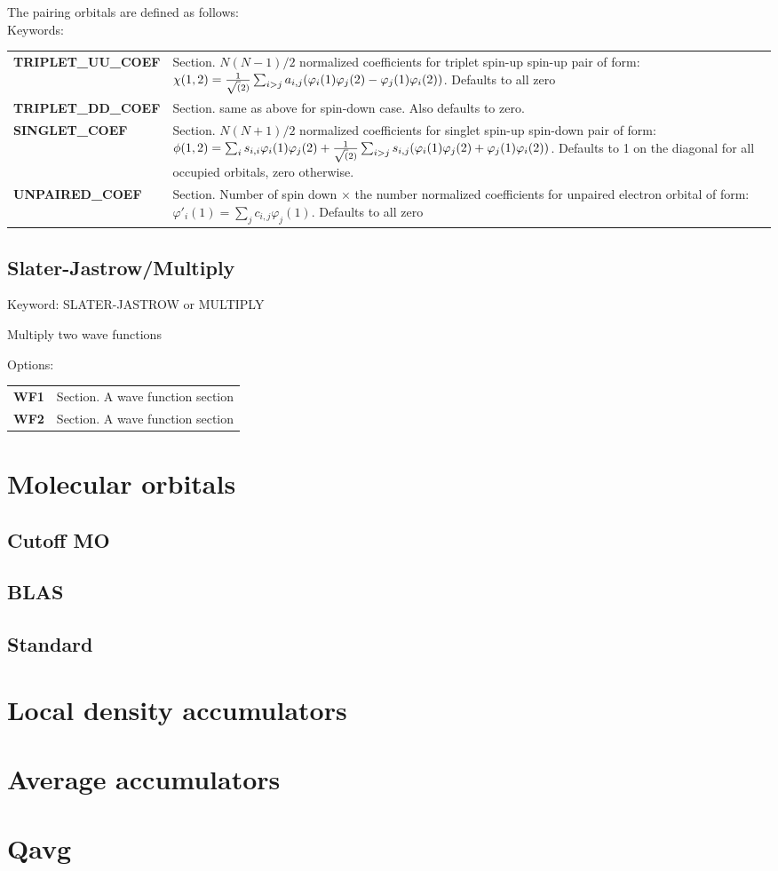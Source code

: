 \documentclass[12pt]{article}
\begin{document}
The pairing orbitals are defined as follows:\\
Keywords: \\
\begin{tabular}{lp{12cm}}
{\bf TRIPLET\_UU\_COEF} & Section. $ N(N-1)/2 $ normalized coefficients for triplet spin-up spin-up pair of form: 
$ \chi(1,2)= {1 \over \sqrt(2)} \sum_{i>j} a_{i,j}( \varphi_i(1)\varphi_j(2)- \varphi_j(1)\varphi_i(2))$. Defaults to all zero \\
{\bf TRIPLET\_DD\_COEF } & Section. same as above for spin-down case.  Also defaults to zero. \\
{\bf SINGLET\_COEF } & Section.  
$ N(N+1)/2 $ normalized coefficients 
for singlet spin-up spin-down pair of form:
$ \phi(1,2)= \sum_{i} s_{i,i} \varphi_i(1)\varphi_j(2) + {1 \over \sqrt(2)} \sum_{i>j} s_{i,j}( \varphi_i(1)\varphi_j(2)+\varphi_j(1)\varphi_i(2))$. Defaults to 1 on the diagonal for all occupied orbitals, zero otherwise. \\
{\bf UNPAIRED\_COEF} & Section.  Number of spin down $\times$ the number normalized coefficients for unpaired electron orbital of form: 
$ \varphi'_{i}(1)= \sum_{j} c_{i,j}\varphi_j(1)$. Defaults to all zero  \\

\end{tabular}



\subsection{Slater-Jastrow/Multiply}

Keyword: SLATER-JASTROW or MULTIPLY

Multiply two wave functions

Options:\\
\begin{tabular}{lp{12cm}}
{\bf WF1} &  Section. A wave function section \\
{\bf WF2} & Section. A wave function section \\
\end{tabular}


\section{Molecular orbitals}
\subsection{Cutoff MO}
\subsection{BLAS} 
\subsection{Standard}

\section{Local density accumulators}

\section{Average accumulators}

\section{Qavg}
\end{document}
